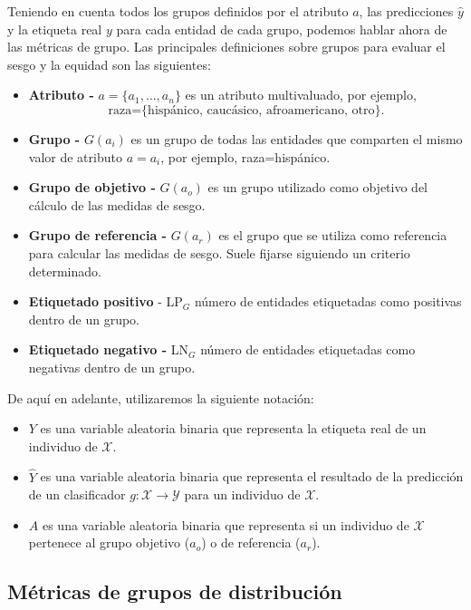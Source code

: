 \documentclass[oneside,openright,titlepage,numbers=noenddot,openany,headinclude,footinclude=true,
cleardoublepage=empty,abstractoff,BCOR=5mm,paper=a4,fontsize=12pt,main=spanish]{scrreprt}
\begin{document}
Teniendo en cuenta todos los grupos definidos por el atributo $a$, las predicciones $\hat{y}$ y la etiqueta real $y$ para cada entidad de cada grupo, podemos hablar
ahora de las métricas de grupo. Las principales definiciones sobre grupos para
evaluar el sesgo y la equidad son las siguientes:

\begin{itemize}
    \item \textbf{Atributo -} $a = \{a_1,\dots,a_n\}$ es un atributo multivaluado, por ejemplo, $$\text{raza=\{hispánico, caucásico, afroamericano, otro\}}.$$
    \item \textbf{Grupo -} $G(a_i)$ es un grupo de todas las entidades que comparten el mismo valor de atributo $a=a_i$, por ejemplo, raza=hispánico.
    \item \textbf{Grupo de objetivo -} $G(a_o)$ es un grupo utilizado como objetivo del cálculo de las medidas de sesgo.
    \item \textbf{Grupo de referencia -} $G(a_r)$ es el grupo que se utiliza como referencia para calcular las medidas de sesgo. Suele fijarse siguiendo un criterio determinado.
    \item \textbf{Etiquetado positivo} - LP$_G$ número de entidades etiquetadas como positivas dentro de un grupo.
    \item \textbf{Etiquetado negativo -} LN$_G$ número de entidades etiquetadas como negativas dentro de un grupo.
\end{itemize}

\begin{notation}
De aquí en adelante, utilizaremos la siguiente notación:

\begin{itemize}
    \item $Y$ es una variable aleatoria binaria que representa la etiqueta real de un individuo de $\mathcal{X}.$
    \item $\hat{Y}$ es una variable aleatoria binaria que representa el resultado de la predicción de un clasificador $g\colon \mathcal{X} \to \mathcal{Y}$ para un individuo de $\mathcal{X}.$
    \item $A$ es una variable aleatoria binaria que representa si un individuo de $\mathcal{X}$ pertenece al grupo objetivo ($a_o$) o de referencia ($a_r$).
\end{itemize}
\end{notation}

\subsection*{Métricas de grupos de distribución}
\end{document}
